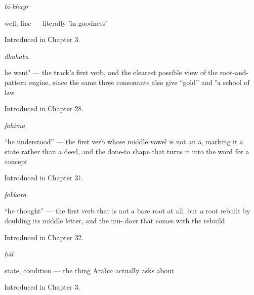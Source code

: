 \noindent\begin{minipage}[t]{\linewidth}
\raggedright
\textbf{}\enspace\emph{bi-khayr}\par
\small well, fine — literally 'in goodness'\par
\footnotesize Introduced in Chapter 3.
\end{minipage}\par\medskip

\noindent\begin{minipage}[t]{\linewidth}
\raggedright
\textbf{}\enspace\emph{dhahaba}\par
\small he went" — the track's first verb, and the clearest possible view of the root-and-pattern engine, since the same three consonants also give \textquotedblleft{}gold\textquotedblright{} and "a school of law\par
\footnotesize Introduced in Chapter 28.
\end{minipage}\par\medskip

\noindent\begin{minipage}[t]{\linewidth}
\raggedright
\textbf{}\enspace\emph{fahima}\par
\small \textquotedblleft{}he understood\textquotedblright{} — the first verb whose middle vowel is not an a, marking it a state rather than a deed, and the done-to shape that turns it into the word for a concept\par
\footnotesize Introduced in Chapter 31.
\end{minipage}\par\medskip

\noindent\begin{minipage}[t]{\linewidth}
\raggedright
\textbf{}\enspace\emph{fakkara}\par
\small \textquotedblleft{}he thought\textquotedblright{} — the first verb that is not a bare root at all, but a root rebuilt by doubling its middle letter, and the mu- doer that comes with the rebuild\par
\footnotesize Introduced in Chapter 32.
\end{minipage}\par\medskip

\noindent\begin{minipage}[t]{\linewidth}
\raggedright
\textbf{}\enspace\emph{ḥāl}\par
\small state, condition — the thing Arabic actually asks about\par
\footnotesize Introduced in Chapter 3.
\end{minipage}\par\medskip

